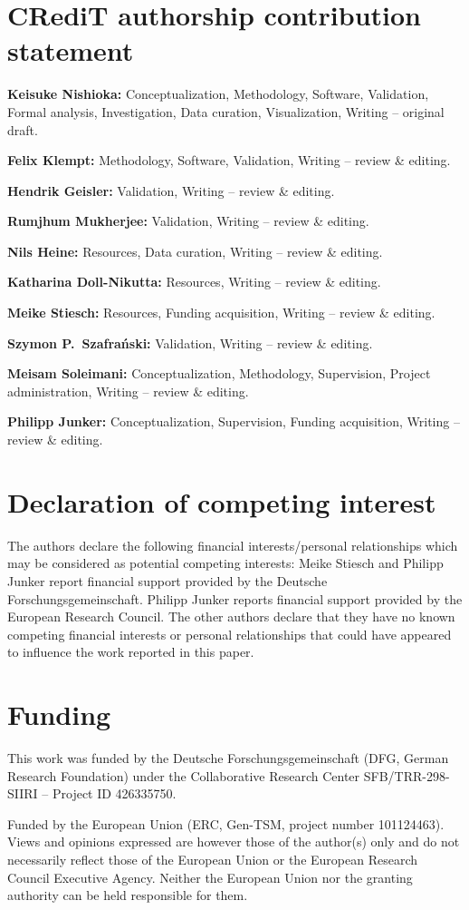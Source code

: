 \documentclass[preprint,12pt]{elsarticle}
\begin{document}
\section*{CRediT authorship contribution statement}
{\sloppy\setlength{\parindent}{0pt}
\textbf{Keisuke Nishioka:} Conceptualization, Methodology, Software, Validation, Formal analysis, Investigation, Data curation, Visualization, Writing -- original draft.\par
\textbf{Felix Klempt:} Methodology, Software, Validation, Writing -- review \& editing.\par
\textbf{Hendrik Geisler:} Validation, Writing -- review \& editing.\par
\textbf{Rumjhum Mukherjee:} Validation, Writing -- review \& editing.\par
\textbf{Nils Heine:} Resources, Data curation, Writing -- review \& editing.\par
\textbf{Katharina Doll-Nikutta:} Resources, Writing -- review \& editing.\par
\textbf{Meike Stiesch:} Resources, Funding acquisition, Writing -- review \& editing.\par
\textbf{Szymon P.\ Szafra\'{n}ski:} Validation, Writing -- review \& editing.\par
\textbf{Meisam Soleimani:} Conceptualization, Methodology, Supervision, Project administration, Writing -- review \& editing.\par
\textbf{Philipp Junker:} Conceptualization, Supervision, Funding acquisition, Writing -- review \& editing.\par
}

\section*{Declaration of competing interest}
The authors declare the following financial interests/personal relationships which may be considered as potential competing interests: Meike Stiesch and Philipp Junker report financial support provided by the Deutsche Forschungsgemeinschaft. Philipp Junker reports financial support provided by the European Research Council. The other authors declare that they have no known competing financial interests or personal relationships that could have appeared to influence the work reported in this paper.

\section*{Funding}
{\sloppy This work was funded by the Deutsche Forschungsgemeinschaft (DFG, German Research Foundation) under the Collaborative Research Center SFB/TRR-298-SIIRI -- Project ID 426335750.\par}
{\sloppy Funded by the European Union (ERC, Gen-TSM, project number 101124463). Views and opinions expressed are however those of the author(s) only and do not necessarily reflect those of the European Union or the European Research Council Executive Agency. Neither the European Union nor the granting authority can be held responsible for them.\par}
\end{document}
